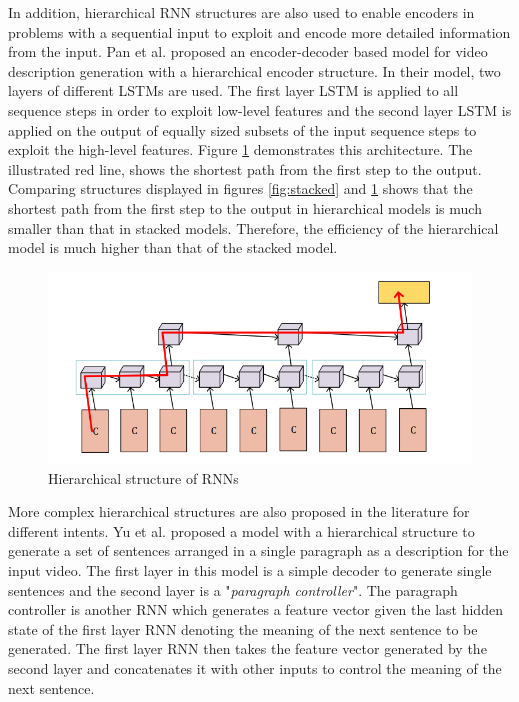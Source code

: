 \documentclass[preprint, 12pt]{elsarticle}
\begin{document}
		In addition, hierarchical RNN structures are also used to enable encoders in problems with a sequential input to exploit and encode more detailed information from the input. Pan et al. \cite{pan2016hierarchical} proposed an encoder-decoder based model for video description generation with a hierarchical encoder structure. In their model, two layers of different LSTMs are used. The first layer LSTM is applied to all sequence steps in order to exploit low-level features and the second layer LSTM is applied on the output of equally sized subsets of the input sequence steps to exploit the high-level features. Figure \ref{fig:hrne} demonstrates this architecture. The illustrated red line, shows the shortest path from the first step to the output. Comparing structures displayed in figures \ref{fig:stacked} and \ref{fig:hrne} shows that the shortest path from the first step to the output in hierarchical models is much smaller than that in stacked models. Therefore, the efficiency of the hierarchical model is much higher than that of the stacked model.
				\begin{figure}[h]
			\centering
			\includegraphics[scale=0.4]{Imgs/hrne.png}
			\caption{Hierarchical structure of RNNs \cite{pan2016hierarchical}}
			\label{fig:hrne}
		\end{figure}
		More complex hierarchical structures are also proposed in the literature for different intents. Yu et al.\cite{yu2016video} proposed a model with a hierarchical structure to generate a set of sentences arranged in a single paragraph as a description for the input video. The first layer in this model is a simple decoder to generate single sentences and the second layer is a "\textit{paragraph controller}". The paragraph controller is another RNN which generates a feature vector given the last hidden state of the first layer RNN denoting the meaning of the next sentence to be generated. The first layer RNN then takes the feature vector generated by the second layer and concatenates it with other inputs to control the meaning of the next sentence.
				
\end{document}
